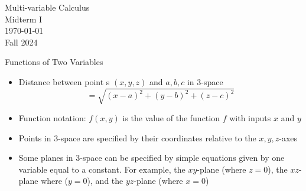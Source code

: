 \documentclass[12pt,letterpaper, onecolumn]{exam}
\begin{document}
	\begingroup  
	\centering
	\LARGE Multi-variable Calculus\\
	\LARGE Midterm I\\[0.5em]
	\large \today\\[0.5em]
	\large Fall 2024\par
	\endgroup
	
	 Functions of Two Variables\\
	\begin{itemize}
		\item 	Distance between point s $(x,y,z)$ and $a,b,c$ in 3-space
		$$=\sqrt{(x-a)^2+(y-b)^2+(z-c)^2}$$
		\item Function notation: $f(x,y)$ is the value of the function $f$ with inputs $x$ and $y$
		\item Points in 3-space are specified by their coordinates relative to the $x,y,z$-axes
		\item Some planes in 3-space can be specified by simple equations given by one variable equal to a constant. For example, the $xy$-plane (where $z=0$), the $xz$-plane where ($y=0$), and the $yz$-plane (where $x=0$)

		
	\end{itemize}
\end{document}
